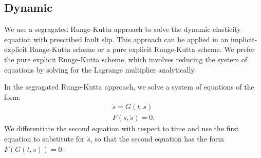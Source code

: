 \subsection{Dynamic}

We use a segragated Runge-Kutta approach \cite{Colomes:Badia:2016} to
solve the dynamic elasticity equation with prescribed fault slip. This
approach can be applied in an implicit-explicit Runge-Kutta scheme or
a pure explicit Runge-Kutta scheme. We prefer the pure explicit
Runge-Kutta scheme, which involves reducing the system of equations by
solving for the Lagrange multiplier analytically.

In the segragated Runge-Kutta approach, we solve a system of equations of the form:
\begin{gather}
  \dot{s} = G(t,s) \\
  F(s,\dot{s}) = 0.
\end{gather}
We differentiate the second equation with respect to time and use the
first equation to substitute for $\dot{s}$, so that the second
equation has the form $F(G(t,s)) = 0$.

